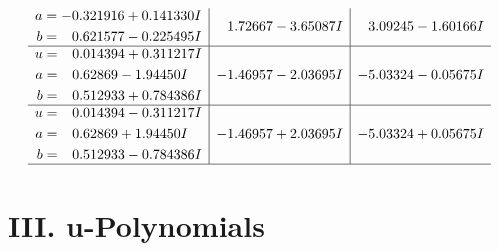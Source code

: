 \documentclass[1p]{elsarticle_modified}
\theoremstyle{definition}
\begin{document}
$$\begin{array}{c|c|c}
\begin{aligned}
a &= -0.321916 + 0.141330 I \\
b &= \phantom{-}0.621577 - 0.225495 I\end{aligned}
 & \phantom{-}1.72667 - 3.65087 I & \phantom{-}3.09245 - 1.60166 I \\ \hline\begin{aligned}
u &= \phantom{-}0.014394 + 0.311217 I \\
a &= \phantom{-}0.62869 - 1.94450 I \\
b &= \phantom{-}0.512933 + 0.784386 I\end{aligned}
 & -1.46957 - 2.03695 I & -5.03324 - 0.05675 I \\ \hline\begin{aligned}
u &= \phantom{-}0.014394 - 0.311217 I \\
a &= \phantom{-}0.62869 + 1.94450 I \\
b &= \phantom{-}0.512933 - 0.784386 I\end{aligned}
 & -1.46957 + 2.03695 I & -5.03324 + 0.05675 I\\
 \hline 
 \end{array}$$\newpage
\newpage\renewcommand{\arraystretch}{1}
\centering \section*{ III. u-Polynomials}
\end{document}
